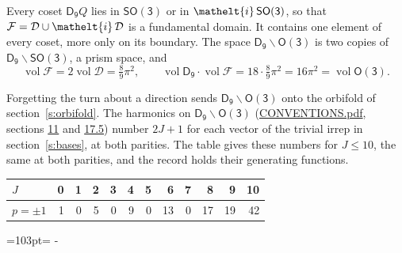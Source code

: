 \documentclass[10pt,a4paper]{article}
\newcommand{\needspace}[1]{\par\penalty-100\begingroup\dimen0=#1\relax\dimen2=\pagegoal
  \advance\dimen2-\pagetotal\ifdim\dimen0>\dimen2\relax\ifdim\dimen2>0pt\vfil\break\fi\fi
  \endgroup}
\numberwithin{equation}{section}
\newcommand{\eltfont}[1]{{\let\sigma\eltsigma\mathelt{#1}}}
\newcommand{\grp}[1]{\mathsf{#1}}
\newcommand{\elt}[1]{\eltfont{#1}}
\newcommand{\vol}{\operatorname{vol}}
\newcommand{\fcell}{\mathcal{D}}
\newcommand{\fdomain}{\mathcal{F}}
\begin{document}
\leavevmode\label{n:set.fundamental}Every coset $\grp{D_{9}}Q$ lies in \href{SO3.pdf}{$\grp{SO(3)}$} or in $\elt{i}\,\grp{SO(3)}$, so that $\fdomain = \fcell \cup \elt{i}\,\fcell$ is a fundamental domain. It contains one element of every coset, more only on its boundary.
The space $\grp{D_{9}}\backslash\grp{O(3)}$ is two copies of $\grp{D_{9}}\backslash\grp{SO(3)}$, a prism space, and
\begin{equation}\label{e:volume}\vol\fdomain = 2\vol\fcell = \tfrac{8}{9}\pi^2,\qquad \vol\grp{D_{9}}\cdot\vol\fdomain = 18\cdot \tfrac{8}{9}\pi^2 = 16\pi^2 = \vol\grp{O(3)}.\end{equation}

Forgetting the turn about a direction sends $\grp{D_{9}}\backslash\grp{O(3)}$ onto the orbifold of section~\ref{s:orbifold}.
The harmonics on $\grp{D_{9}}\backslash\grp{O(3)}$ (\href{../../CONVENTIONS.pdf}{CONVENTIONS.pdf}, sections \href{../../CONVENTIONS.pdf\#conv.11}{11} and \href{../../CONVENTIONS.pdf\#conv.17.5}{17.5}) number $2J + 1$ for each vector of the trivial irrep in section~\ref{s:bases}, at both parities. The table gives these numbers for $J \le 10$, the same at both parities, and the record holds their generating functions.
{\small\setlength{\tabcolsep}{4pt}\begin{longtable}{@{}lrrrrrrrrrrr@{}}\toprule
$J$ & 0 & 1 & 2 & 3 & 4 & 5 & 6 & 7 & 8 & 9 & 10\\\midrule\endhead
\bottomrule\endfoot\endlastfoot
$p = \pm 1$ & 1 & 0 & 5 & 0 & 9 & 0 & 13 & 0 & 17 & 19 & 42\\
\bottomrule\end{longtable}}
\needspace{103pt}
\end{document}
